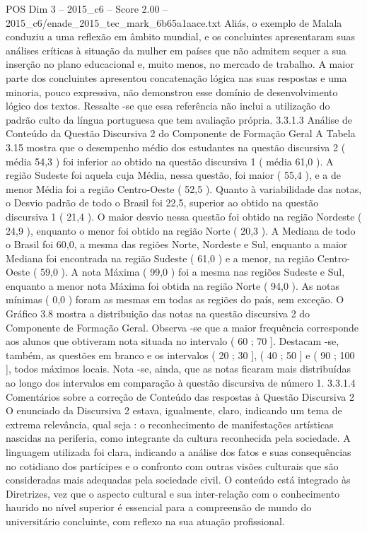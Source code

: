 \begin{textsample}{POS Dim 3 – 2015\_c6 – Score 2.00 – 2015\_c6/enade\_2015\_tec\_mark\_6b65a1aace.txt}
Aliás, o exemplo de Malala conduziu a uma reflexão em âmbito mundial, e os concluintes apresentaram suas análises críticas à situação da mulher em países que não admitem sequer a sua inserção no plano educacional e, muito menos, no mercado de trabalho.
A maior parte dos concluintes apresentou concatenação lógica nas suas respostas e uma minoria, pouco expressiva, não demonstrou esse domínio de desenvolvimento lógico dos textos.
Ressalte -se que essa referência não inclui a utilização do padrão culto da língua portuguesa que tem avaliação própria. 3.3.1.3 Análise de Conteúdo da Questão Discursiva 2 do Componente de Formação Geral A Tabela 3.15 mostra que o desempenho médio dos estudantes na questão discursiva 2 ( média 54,3 ) foi inferior ao obtido na questão discursiva 1 ( média 61,0 ).
A região Sudeste foi aquela cuja Média, nessa questão, foi maior ( 55,4 ), e a de menor Média foi a região Centro-Oeste ( 52,5 ).
Quanto à variabilidade das notas, o Desvio padrão de todo o Brasil foi 22,5, superior ao obtido na questão discursiva 1 ( 21,4 ).
O maior desvio nessa questão foi obtido na região Nordeste ( 24,9 ), enquanto o menor foi obtido na região Norte ( 20,3 ).
A Mediana de todo o Brasil foi 60,0, a mesma das regiões Norte, Nordeste e Sul, enquanto a maior Mediana foi encontrada na região Sudeste ( 61,0 ) e a menor, na região Centro-Oeste ( 59,0 ).
A nota Máxima ( 99,0 ) foi a mesma nas regiões Sudeste e Sul, enquanto a menor nota Máxima foi obtida na região Norte ( 94,0 ).
As notas mínimas ( 0,0 ) foram as mesmas em todas as regiões do país, sem exceção.
O Gráfico 3.8 mostra a distribuição das notas na questão discursiva 2 do Componente de Formação Geral.
Observa -se que a maior frequência corresponde aos alunos que obtiveram nota situada no intervalo ( 60 ; 70 ].
Destacam -se, também, as questões em branco e os intervalos ( 20 ; 30 ], ( 40 ; 50 ] e ( 90 ; 100 ], todos máximos locais.
Nota -se, ainda, que as notas ficaram mais distribuídas ao longo dos intervalos em comparação à questão discursiva de número 1. 3.3.1.4 Comentários sobre a correção de Conteúdo das respostas à Questão Discursiva 2 O enunciado da Discursiva 2 estava, igualmente, claro, indicando um tema de extrema relevância, qual seja : o reconhecimento de manifestações artísticas nascidas na periferia, como integrante da cultura reconhecida pela sociedade.
A linguagem utilizada foi clara, indicando a análise dos fatos e suas consequências no cotidiano dos partícipes e o confronto com outras visões culturais que são consideradas mais adequadas pela sociedade civil.
O conteúdo está integrado às Diretrizes, vez que o aspecto cultural e sua inter-relação com o conhecimento haurido no nível superior é essencial para a compreensão de mundo do universitário concluinte, com reflexo na sua atuação profissional.

\end{textsample}

